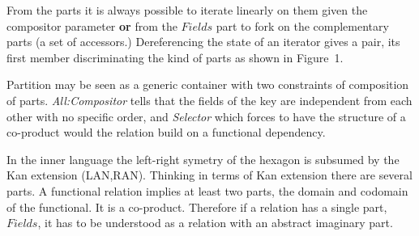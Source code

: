 \hfill
\noindent
From the parts it is always possible to iterate linearly on them given 
the compositor parameter {\bf or} from the $Fields$ part to fork on 
the complementary parts (a set of accessors.) Dereferencing the state 
of an iterator gives a pair, its first member discriminating the kind of 
parts as shown in Figure~1.

Partition may be seen as a generic container with two constraints
of composition of parts. {\it All:Compositor} tells that the fields of 
the key are independent from each other with no specific order, and 
{\it Selector} which forces to have the structure of a co-product would
the relation build on a functional dependency.

In the inner language the left-right symetry of the hexagon is subsumed by 
the Kan extension (LAN,RAN). 
Thinking in terms of Kan extension there are several parts. A functional relation 
implies at least two parts, the domain and codomain of the functional. It is a co-product. 
Therefore if a relation has a single part, $Fields$, it has to be 
understood as a relation with an abstract imaginary part.

